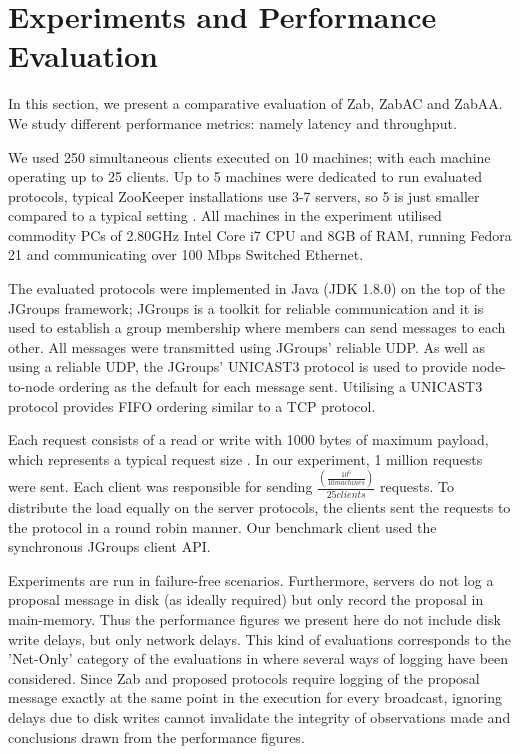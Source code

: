 \documentclass[a4paper,UKenglish]{oasics-v2016}
\begin{document}
\section{Experiments and Performance Evaluation} \label{Evaluation}

In this section, we present a comparative evaluation of Zab, ZabAC and ZabAA. We study different performance metrics: namely latency and throughput.

We used 250 simultaneous clients executed on 10 machines; with each machine operating up to 25 clients. Up to 5 machines were dedicated to run evaluated protocols, typical ZooKeeper installations use 3-7
servers, so 5 is just smaller compared to a typical setting \cite{r2}. All machines in the experiment utilised commodity PCs of 2.80GHz Intel Core i7 CPU and 8GB of RAM,  running Fedora 21 and communicating over 100 Mbps Switched Ethernet.

The evaluated protocols were implemented in Java (JDK 1.8.0) on the top of the JGroups framework; JGroups is a toolkit for reliable communication and it is used to establish a group membership where members can send messages to each other. All messages were transmitted using JGroups' reliable UDP. As well as using a reliable UDP, the JGroups' UNICAST3 protocol is used to provide node-to-node ordering as the default for each message sent. Utilising a UNICAST3 protocol provides FIFO ordering similar to a TCP protocol.

Each request consists of a read or write with 1000 bytes of maximum payload, which represents a typical request size \cite{r2}. In our experiment, 1 million requests were sent. Each client was responsible for sending $\frac{(\frac{10^{6}}{10machines})}{25clients}$ requests. To distribute the load equally on the server protocols, the clients sent the requests to the protocol in a round robin manner. Our benchmark client used the synchronous JGroups client API.

Experiments are run in failure-free scenarios.
Furthermore, servers do not log a proposal message in disk (as ideally required)
but only record the proposal in main-memory.
Thus the performance figures we present here do not include disk write delays, but only
network delays. This kind of evaluations corresponds to the
'Net-Only' category of the evaluations in \cite{r2} where several ways of logging
have been considered. Since Zab and proposed protocols require logging of the proposal message
exactly at the same point in the execution for every broadcast,
ignoring delays due to disk writes cannot invalidate the integrity of
observations made and conclusions drawn from the
performance figures.
\end{document}
